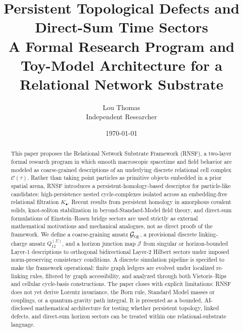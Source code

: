 \documentclass[11pt]{article}
\newcommand{\Ccal}{\mathcal{C}}
\newcommand{\Gcg}{\mathcal{G}_{\rm cg}}
\newcommand{\Jmap}{\mathcal{J}}
\newcommand{\Qlink}{Q_{12}^{(\Sigma)}}
\begin{document}
\title{Persistent Topological Defects and Direct-Sum Time Sectors\\[0.4em]\large A Formal Research Program and Toy-Model Architecture for a Relational Network Substrate}

\author{Lou Thomas\\\small Independent Researcher}

\date{\today}

\maketitle

\begin{abstract}
This paper proposes the Relational Network Substrate Framework (RNSF), a two-layer formal research program in which smooth macroscopic spacetime and field behavior are modeled as coarse-grained descriptions of an underlying discrete relational cell complex \(\Ccal(\tau)\). Rather than taking point particles as primitive objects embedded in a prior spatial arena, RNSF introduces a persistent-homology-based descriptor for particle-like candidates: high-persistence nested cycle-complexes isolated across an embedding-free relational filtration \(K_\bullet\). Recent results from persistent homology in amorphous covalent solids, knot-soliton stabilization in beyond-Standard-Model field theory, and direct-sum formulations of Einstein--Rosen bridge sectors are used strictly as external mathematical motivations and mechanical analogues, not as direct proofs of the framework. We define a coarse-graining ansatz \(\Gcg\), a provisional discrete linking-charge ansatz \(\Qlink\), and a horizon junction map \(\Jmap\) from singular or horizon-bounded Layer-1 descriptions to orthogonal bidirectional Layer-2 Hilbert sectors under imposed norm-preserving consistency conditions. A discrete simulation pipeline is specified to make the framework operational: finite graph ledgers are evolved under localized re-linking rules, filtered by graph accessibility, and analyzed through both Vietoris--Rips and cellular cycle-basis constructions. The paper closes with explicit limitations: RNSF does not yet derive Lorentz invariance, the Born rule, Standard Model masses or couplings, or a quantum-gravity path integral. It is presented as a bounded, AI-disclosed mathematical architecture for testing whether persistent topology, linked defects, and direct-sum horizon sectors can be treated within one relational-substrate language.
\end{abstract}
\end{document}
